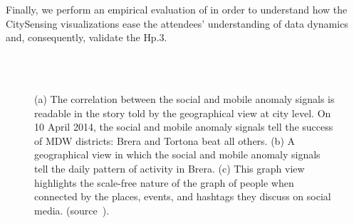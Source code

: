 Finally, we perform an empirical evaluation of \frappe{} in order to understand how the CitySensing visualizations ease the attendees' understanding of data dynamics and, consequently, validate the \textsf{Hp.3}. 

\begin{figure}[p]
\centering
{}\\
\\
\caption{(a) The correlation between the social and mobile anomaly signals is readable in the story told by the geographical view at city level. On 10 April 2014, the social and mobile anomaly signals tell the success of MDW districts: Brera and Tortona beat all others. (b) A geographical view in which the social and mobile anomaly signals tell the daily pattern of activity in Brera. (c) This graph view highlights the scale-free nature of the graph of people when connected by the places, events, and hashtags they discuss on social media. (source~\cite{DBLP:journals/ieeemm/BalduiniVALAC15}).}
\label{fig:eval-empirical}
\end{figure}

